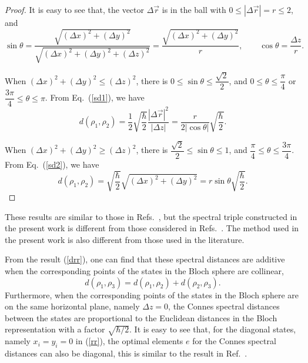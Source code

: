 \documentclass[a4paper,12pt]{article}
\begin{document}
\begin{proof}
It is easy to see that, the vector $\Delta \vec{r}$ is in the ball with $0\leqslant |\Delta \vec{r}|= r \leqslant 2$, and
\begin{equation}
	\sin \theta=\frac{\sqrt{(\Delta x)^2+(\Delta y)^2}}{\sqrt{(\Delta x)^2+(\Delta y)^2+(\Delta z)^2}}
	=\frac{\sqrt{(\Delta x)^2+(\Delta y)^2}}{r},\qquad
	\cos \theta=\frac{\Delta z}{r}.
\end{equation}

When
$(\Delta x)^2+(\Delta y)^2\leqslant (\Delta z)^2$, there is
$0\leqslant \sin\theta \leqslant\dfrac{\sqrt{2}}{2}$,
and $0\leqslant \theta \leqslant \dfrac{\pi}{4}$ or $\dfrac{3\pi}{4}\leqslant \theta \leqslant \pi$. From Eq.~(\ref{sd1}), we have
\begin{equation}
	d(\rho_1,\rho_2)
	=\frac{1}{2}\sqrt{\frac{\hbar}{2}}\frac{|\Delta \vec{r}|^2}{|\Delta z|}
	=\dfrac{r}{2|\cos\theta|}\sqrt{\dfrac{\hbar}{2}}.
\end{equation}


When $(\Delta x)^2+(\Delta y)^2\geqslant (\Delta z)^2$,
there is
$\dfrac{\sqrt{2}}{2}\leqslant \sin\theta \leqslant 1$,
and $\dfrac{\pi}{4}\leqslant \theta \leqslant\dfrac{3\pi}{4}$. From Eq.~(\ref{sd2}), we have
\begin{equation}
	d(\rho_1,\rho_2)
	=\sqrt{\frac{\hbar}{2}}\sqrt{(\Delta x)^2+(\Delta y)^2}
	=r\sin\theta\sqrt{\dfrac{\hbar}{2}}.
\end{equation}
\end{proof}

These results are similar to those in Refs.~\cite{Cagnache,Pythagoras1}, but the spectral triple constructed in the present work is different from those considered in Refs.~\cite{Cagnache,Pythagoras1}. The method used in the present work is also different from those used in the literature.

From the result (\ref{drr}), one can find that these spectral distances are additive when the corresponding points of the states in the Bloch sphere are collinear,
\begin{equation}
	d(\rho_1, \rho_3)=d(\rho_1, \rho_2)+d(\rho_2, \rho_3).
\end{equation}
Furthermore, when the corresponding points of the states in the Bloch sphere are
on the same horizontal plane, namely $\Delta z=0$, the Connes spectral distances between the states are proportional to the Euclidean distances in the Bloch representation with a factor $\sqrt{\hbar/2}$.
It is easy to see that, for the diagonal states, namely $x_i=y_i=0$ in (\ref{rr}), the optimal elements $e$ for the Connes spectral distances can also be diagonal, this is similar to the result in Ref.~\cite{Lin2}.
\end{document}

